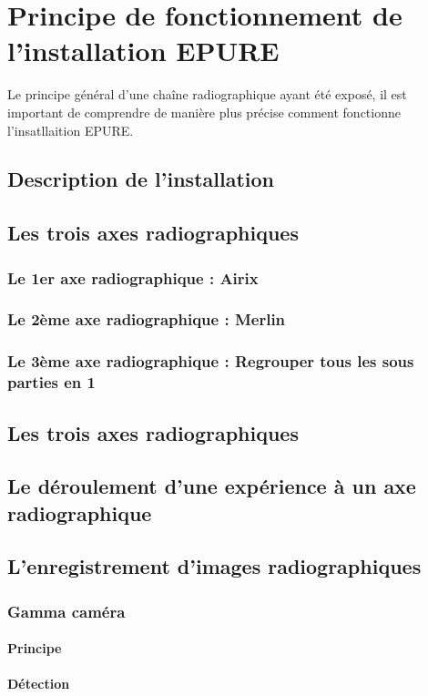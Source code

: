 \documentclass[12pt,a4paper]{report}
\begin{document}
\section{Principe de fonctionnement de l'installation EPURE}
Le principe général d'une chaîne radiographique ayant été exposé, il est important de comprendre de manière plus précise comment fonctionne l'insatllaition EPURE.

\subsection{Description de l'installation}
\subsection{Les trois axes radiographiques}
\subsubsection{Le 1er axe radiographique : Airix}
\subsubsection{Le 2ème axe radiographique : Merlin}
\subsubsection{Le 3ème axe radiographique : Regrouper tous les sous parties en 1}
\subsection{Les trois axes radiographiques}
\subsection{Le déroulement d'une expérience à un axe radiographique}
\subsection{L'enregistrement d'images radiographiques}
\subsubsection{Gamma caméra}
\paragraph{Principe}
\paragraph{Détection}
\end{document}
